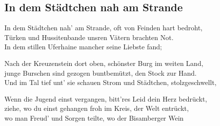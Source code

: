 
\subsection*{In dem Städtchen nah am Strande}
%
%
%
\nopagebreak
{}
%
\nopagebreak
\thestrophe In dem Städtchen nah' am Strande, oft von Feinden hart bedroht, \\
Türken und Hussitenbande unsren Vätern brachten Not. \\
In dem stillen Uferhaine mancher seine Liebste fand; \\

\thestrophe Nach der Kreuzenstein dort oben, schönster Burg im weiten Land, \\
junge Burschen sind gezogen buntbemützt, den Stock zur Hand. \\
Und im Tal tief unt' sie schauen Strom und Städtchen, stolzgeschwellt, \\ 

\thestrophe Wenn die Jugend einst vergangen, bitt'res Leid dein Herz bedrückt, \\
ziehe, wo du einst gehangen froh im Kreis, der Welt entrückt, \\
wo man Freud' und Sorgen teilte, wo der Bisamberger Wein \\
